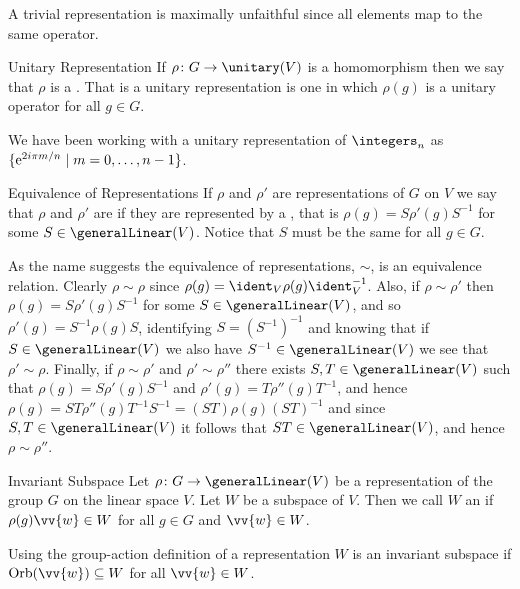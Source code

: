 A trivial representation is maximally unfaithful since all elements map to
the same operator.

\begin{dfn}{Unitary Representation}{}
    If \(\rho \colon G \to \unitary(V)\) is a homomorphism then we say that
    \(\rho\) is a .
    That is a unitary representation is one in which \(\rho(g)\) is a
    unitary operator for all \(g \in G\).
\end{dfn}

We have been working with a unitary representation of \(\integers_n\) as
\(\{\mathrm{e}^{2i\pi m/n} \mid m = 0, \dotsc, n - 1\}\).

\begin{dfn}{Equivalence of Representations}{}
    If \(\rho\) and \(\rho'\) are representations of \(G\) on \(V\) we say
    that \(\rho\) and \(\rho'\) are  if they are represented by a , that is \(\rho(g) = S\rho'(g)S^{-1}\) for some \(S \in
    \generalLinear(V)\).
    Notice that \(S\) must be the same for all \(g \in G\).
\end{dfn}

As the name suggests the equivalence of representations, \(\sim\), is an
equivalence relation.
Clearly \(\rho \sim \rho\) since \(\rho(g) = \ident_V\rho(g)\ident_V^{-1}\).
Also, if \(\rho \sim \rho'\) then \(\rho(g) = S\rho'(g)S^{-1}\) for some \(S
\in \generalLinear(V)\), and so \(\rho'(g) = S^{-1}\rho(g)S\), identifying \(S =
(S^{-1})^{-1}\) and knowing that if \(S \in \generalLinear(V)\) we also have
\(S^{-1} \in \generalLinear(V)\) we see that \(\rho' \sim \rho\).
Finally, if \(\rho \sim \rho'\) and \(\rho' \sim \rho''\) there exists \(S,
T \in \generalLinear(V)\) such that \(\rho(g) = S\rho'(g)S^{-1}\) and \(\rho'(g)
= T\rho''(g)T^{-1}\), and hence \(\rho(g) = ST\rho''(g)T^{-1}S^{-1} =
(ST)\rho(g)(ST)^{-1}\) and since \(S, T \in \generalLinear(V)\) it follows that
\(ST \in \generalLinear(V)\), and hence \(\rho \sim \rho''\).

\begin{dfn}{Invariant Subspace}{}
    Let \(\rho \colon G \to \generalLinear(V)\) be a representation of the
    group \(G\) on the linear space \(V\).
    Let \(W\) be a subspace of \(V\).
    Then we call \(W\) an  if
    \(\rho(g)\vv{w} \in W\) for all \(g \in G\) and \(\vv{w} \in W\).
    
    Using the group-action definition of a representation \(W\) is an
    invariant subspace if \(\Orb(\vv{w}) \subseteq W\) for all \(\vv{w} \in W\).
\end{dfn}

